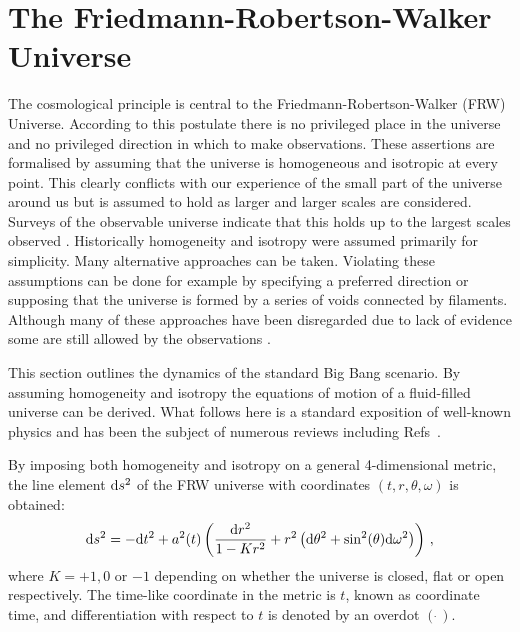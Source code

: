 \section{The Friedmann-Robertson-Walker Universe}
\label{sec:frw-intro}
The cosmological principle is central to the Friedmann-Robertson-Walker
(FRW\footnotemark) Universe. 
According to this postulate there is no privileged
place in the universe and no privileged direction in which to make observations.
These assertions
are formalised by assuming that the universe is homogeneous and isotropic at
every point. This clearly conflicts with our experience of the small part of
the universe around us but is assumed to hold as larger and larger scales are
considered.
Surveys of the observable universe indicate that this holds up to the largest
scales observed \cite{Colless:2001gk, York:2000gk}. 
Historically homogeneity and isotropy were assumed primarily for simplicity.
Many alternative approaches can be taken. Violating these assumptions can
be done for example by specifying a preferred direction or supposing that the
universe is formed by a series of voids connected by filaments. Although many
of these approaches have been disregarded due to lack of evidence some are still
allowed by the observations
\cite{GarciaBellido:2008nz,Alexander:2007xx,Alnes:2005rw,Hunt:2008wp}.

This section outlines the dynamics of the standard Big Bang scenario.
By assuming homogeneity and isotropy the equations of motion of a
fluid-filled universe can be derived. What follows here is a
standard exposition of well-known physics and has been the subject of
numerous reviews including Refs~\cite{book:kolbturner, book:kip, book:liddle}.


By imposing both homogeneity and isotropy on a general 4-dimensional metric, the
line element $\mathrm{d} s^2$ of the FRW universe with coordinates $(t,r,\theta,\omega)$
is obtained:
% 
\begin{equation}
 \label{eq:frwmetric-intro}
\mathrm{d} s^2 = -\mathrm{d} t^2 + a^2(t)
  \left( 
    \frac{\mathrm{d} r^2}{1-Kr^2} + r^2\left(\mathrm{d}\theta^2 + \sin^2(\theta)
\mathrm{d}\omega^2\right)
  \right)\,,
\end{equation}
% 
where $K=+1, 0$ or $-1$ depending on whether the universe is closed, flat
or open respectively. The time-like coordinate in the metric is $t$, known as
coordinate time, and differentiation with respect to $t$ is denoted by an
overdot $(\dot{~})$. 


